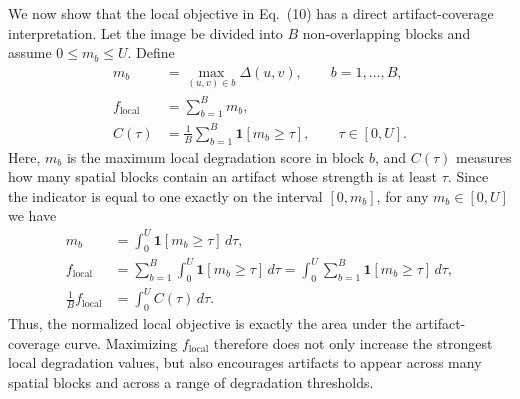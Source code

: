We now show that the local objective in Eq.~(10) has a direct
artifact-coverage interpretation. Let the image be divided into
$B$ non-overlapping blocks and assume $0\le m_b\le U$. Define
\begin{align*}
m_b &= \max_{(u,v)\in b}\Delta(u,v), \qquad b=1,\ldots,B, \\
f_{\mathrm{local}} &= \sum_{b=1}^{B}m_b, \\
C(\tau) &= \frac{1}{B}\sum_{b=1}^{B}\mathbf{1}[m_b\ge \tau],
\qquad \tau\in[0,U].
\end{align*}
Here, $m_b$ is the maximum local degradation score in block $b$,
and $C(\tau)$ measures how many spatial blocks contain an artifact
whose strength is at least $\tau$. Since the indicator is equal to
one exactly on the interval $[0,m_b]$, for any $m_b\in[0,U]$ we have
\begin{align*}
m_b &= \int_{0}^{U}\mathbf{1}[m_b\ge\tau]\,d\tau, \\
f_{\mathrm{local}}
&= \sum_{b=1}^{B}\int_{0}^{U}\mathbf{1}[m_b\ge\tau]\,d\tau
= \int_{0}^{U}\sum_{b=1}^{B}\mathbf{1}[m_b\ge\tau]\,d\tau, \\
\frac{1}{B}f_{\mathrm{local}} &= \int_{0}^{U} C(\tau)\,d\tau .
\end{align*}
Thus, the normalized local objective is exactly the area under
the artifact-coverage curve. Maximizing $f_{\mathrm{local}}$
therefore does not only increase the strongest local degradation
values, but also encourages artifacts to appear across many
spatial blocks and across a range of degradation thresholds.


